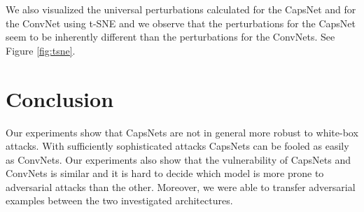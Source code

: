\documentclass{article}
\begin{document}
We also visualized the universal perturbations calculated for the CapsNet and for the ConvNet using t-SNE \cite{tsne} and we observe that the perturbations for the CapsNet seem to be inherently different than the perturbations for the ConvNets. See Figure \ref{fig:tsne}.

\section{Conclusion}
Our experiments show that CapsNets are not in general more robust to white-box attacks. With sufficiently sophisticated attacks CapsNets can be fooled as easily as ConvNets.  Our experiments also show that the vulnerability of CapsNets and ConvNets is similar and it is hard to decide which model is more prone to adversarial attacks than the other. Moreover, we were able to transfer adversarial examples between the two investigated architectures.






\end{document}
